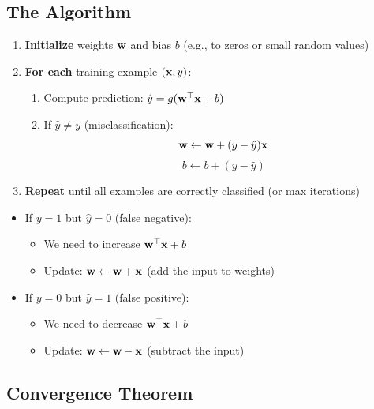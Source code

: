 \subsection{The Algorithm}

\begin{enumerate}
    \item \textbf{Initialize} weights $\mathbf{w}$ and bias $b$ (e.g., to zeros or small random values)
    \item \textbf{For each} training example $(\mathbf{x}, y)$:
    \begin{enumerate}
        \item Compute prediction: $\hat{y} = g(\mathbf{w}^\top \mathbf{x} + b)$
        \item If $\hat{y} \neq y$ (misclassification):
        \[
        \mathbf{w} \leftarrow \mathbf{w} + (y - \hat{y}) \mathbf{x}
        \]
        \[
        b \leftarrow b + (y - \hat{y})
        \]
    \end{enumerate}
    \item \textbf{Repeat} until all examples are correctly classified (or max iterations)
\end{enumerate}

\begin{bluebox}
\begin{itemize}
    \item If $y = 1$ but $\hat{y} = 0$ (false negative):
    \begin{itemize}
        \item We need to increase $\mathbf{w}^\top \mathbf{x} + b$
        \item Update: $\mathbf{w} \leftarrow \mathbf{w} + \mathbf{x}$ (add the input to weights)
    \end{itemize}
    \item If $y = 0$ but $\hat{y} = 1$ (false positive):
    \begin{itemize}
        \item We need to decrease $\mathbf{w}^\top \mathbf{x} + b$
        \item Update: $\mathbf{w} \leftarrow \mathbf{w} - \mathbf{x}$ (subtract the input)
    \end{itemize}
\end{itemize}
\end{bluebox}

\subsection{Convergence Theorem}

